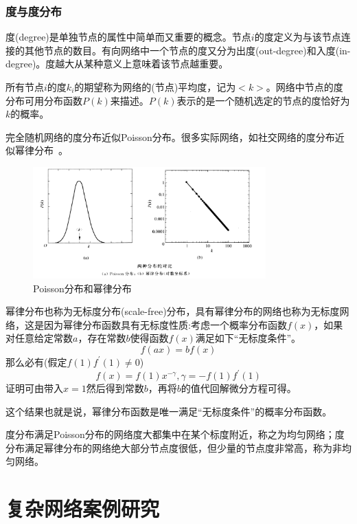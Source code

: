 \documentclass[11pt]{article}
\begin{document}
		\subsubsection*{度与度分布}	
			度(degree)是单独节点的属性中简单而又重要的概念。节点$i$的度定义为与该节点连接的其他节点的数目。有向网络中一个节点的度又分为出度(out-degree)和入度(in-degree)。度越大从某种意义上意味着该节点越重要。 \par
			所有节点$i$的度$k_i$的期望称为网络的(节点)平均度，记为$<k>$。网络中节点的度分布可用分布函数$P(k)$来描述。$P(k)$表示的是一个随机选定的节点的度恰好为$k$的概率。\par
			完全随机网络的度分布近似Poisson分布。很多实际网络，如社交网络的度分布近似幂律分布~\cite{w1_book}。
			
			\begin{figure}[htbp]
				\centering
				\includegraphics[width=0.8\textwidth]{pic/01-pandp.png}
				\caption{Poisson分布和幂律分布}
			\end{figure}
			
			幂律分布也称为无标度分布(scale-free)分布，具有幂律分布的网络也称为无标度网络，这是因为幂律分布函数具有无标度性质:考虑一个概率分布函数$f(x)$，如果对任意给定常数$a$，存在常数$b$使得函数$f(x)$满足如下“无标度条件”。
			$$f(ax) = bf(x)$$
			那么必有(假定$f(1)f^\prime(1) \ne 0$)
			$$f(x) = f(1)x^{-\gamma}, \gamma = -f(1)f^\prime(1)$$
			证明可由带入$x=1$然后得到常数$b$，再将$b$的值代回解微分方程可得。\par
			这个结果也就是说，幂律分布函数是唯一满足“无标度条件”的概率分布函数。 \par
			度分布满足Poisson分布的网络度大都集中在某个标度附近，称之为均匀网络；度分布满足幂律分布的网络绝大部分节点度很低，但少量的节点度非常高，称为非均匀网络。
			
\section{复杂网络案例研究}
		
\end{document}
